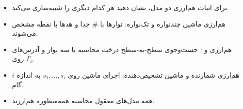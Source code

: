 \begin{summary}
\begin{itemize}
\item برای اثبات هم‌ارزی دو مدل، نشان دهید هر کدام دیگری را شبیه‌سازی می‌کند.
\item هم‌ارزی ماشین چندنواره و تک‌نواره: نوارها با $\#$ جدا و هدها با نقطه مشخص می‌شوند.
\item هم‌ارزی  و : جست‌وجوی سطح-به-سطح درخت محاسبه با سه نوار و آدرس‌های روی $\Gamma_b$.
\item هم‌ارزی شمارنده و ماشین تشخیص‌دهنده: اجرای ماشین روی $s_1,\dots,s_i$ به اندازه $i$ گام.
\item همه مدل‌های معقول محاسبه همه‌منظوره هم‌ارزند.
\end{itemize}
\end{summary}
